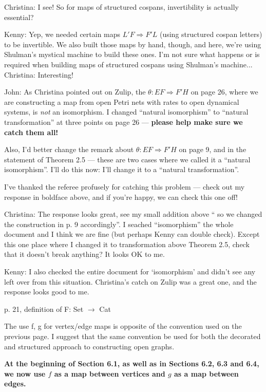 \documentclass[reqno]{amsart}
\def\chris{\color{purple} Christina: }
\def\john{\color{red} John: }
\def\kenny{\color{blue} Kenny: }
\begin{document}
\begin{enumerate}
{{\chris I see! So for maps of structured cospans, invertibility is actually essential?}

{\kenny Yep, we needed certain maps $L' F \Rightarrow F' L$ (using structured cospan letters) to be invertible. We also built those maps by hand, 
though, and here, we're using Shulman's mystical machine to build these ones. I'm not sure what happens or is required when building maps of 
structured cospans using Shulman's machine...} {\chris Interesting!}

{\john  As Christina pointed out on Zulip, the $\theta : EF \Rightarrow F'H$ on page 26, where we are
constructing a map from open Petri nets with rates to open dynamical systems, is \emph{not} an
isomorphism.  I changed ``natural isomorphism'' to ``natural transformation'' at three points on page 26 --- 
{\bf please help make sure we catch them all!}

Also, I'd better change the remark about  $\theta: EF \Rightarrow F'H$  on page 9, and
 in the statement of Theorem 2.5 --- these are two cases where we called it a ``natural 
isomorphism''.    I'll do this now: I'll change it to a ``natural transformation''.

I've thanked the referee profusely for catching this problem --- check out my response in boldface
above, and if you're happy, we can check this one off!}

{\chris The response looks great, see my small addition above `` so we changed the construction in p. 
9 accordingly''. I seached ``isomorphism'' the whole document and I think we are fine (but perhaps 
Kenny can double check). Except this one place where I changed it to transformation above Theorem 2.5, check that it doesn't break anything? It looks 
OK to me.}

{\kenny I also checked the entire document for `isomorphism' and didn't see any left over from this situation. Christina's catch on Zulip was a great one, and the response looks good to me.}
\fi

\item p. 21, definition of F: Set $\to$ Cat

The use f, g for vertex/edge maps is opposite of the convention used on the previous page. I suggest that the same convention be used for both the 
decorated and structured approach to constructing open graphs.

{\bf At the beginning of Section 6.1, as well as in Sections 6.2, 6.3 and 6.4, we now use $f$ as a map between vertices and $g$ as a map 
between edges.} 

}
\end{enumerate}
\end{document}
